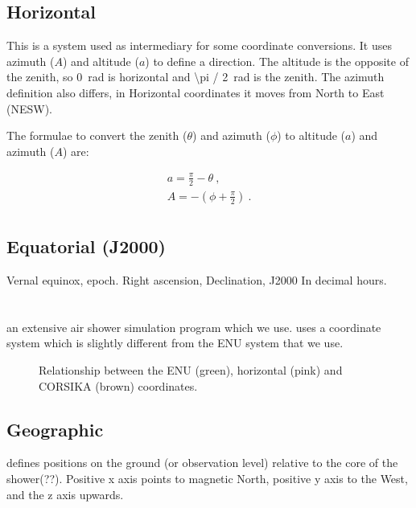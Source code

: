 \subsection{Horizontal}

This is a system used as intermediary for some coordinate conversions.
It uses azimuth ($A$) and altitude ($a$) to define a direction. The
altitude is the opposite of the zenith, so \SI{0}{\radian} is horizontal
and \SI{\pi / 2}{\radian} is the zenith. The azimuth definition also
differs, in Horizontal coordinates it moves from North to East (NESW).

The formulae to convert the zenith ($\theta$) and azimuth ($\phi$) to
altitude ($a$) and azimuth ($A$) are:

\begin{equation}
    \begin{array}{l}
        a = \frac{\pi}{2} - \theta \ , \\
        A = - (\phi + \frac{\pi}{2}) \ . \\
    \end{array}
\end{equation}


\subsection{Equatorial (J2000)}

Vernal equinox, epoch.
Right ascension, Declination, J2000
In decimal hours.


\section{\corsika}

\corsika an extensive air shower simulation program which we use.
\corsika uses a coordinate system which is slightly different from the
ENU system that we use\cite{corsika}.

\begin{figure}
    \centering
    
    \caption{Relationship between the ENU (green), horizontal (pink)
             and CORSIKA (brown) coordinates.}
    \label{fig:enu_corsika}
\end{figure}


\subsection{Geographic}

\corsika defines positions on the ground (or observation level) relative
to the core of the shower(??). Positive x axis points to magnetic North,
positive y axis to the West, and the z axis upwards.

